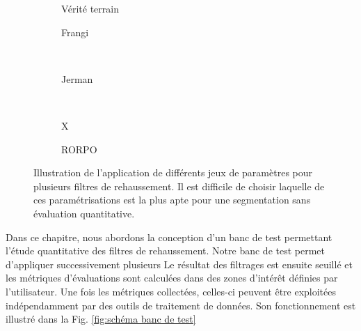 \begin{figure}[!ht]
  \captionsetup[subfigure]{justification=centering}
  \begin{subfigure}{\textwidth}
    \centering
  \caption{Vérité terrain}
  \end{subfigure}
  \begin{subfigure}{\textwidth}
  \caption{Frangi}
  \end{subfigure}
  \\
  \begin{subfigure}{\textwidth}
  \caption{Jerman}
  \end{subfigure}
  \\
  \begin{subfigure}{\textwidth}
  X
  \caption{RORPO}
  \end{subfigure}
  \caption{Illustration de l'application de différents jeux de paramètres pour plusieurs filtres de rehaussement. Il est difficile de choisir laquelle de ces paramétrisations est la plus apte pour une segmentation sans évaluation quantitative.}
  \label{fig:problematics}
\end{figure}

Dans ce chapitre, nous abordons la conception d'un banc de test permettant l'étude quantitative des filtres de rehaussement. Notre banc de test permet d'appliquer successivement plusieurs  Le résultat des filtrages est ensuite seuillé et les métriques d'évaluations sont calculées dans des zones d'intérêt définies par l'utilisateur. Une fois les métriques collectées, celles-ci peuvent être exploitées indépendamment par des outils de traitement de données. Son fonctionnement est illustré dans la Fig. \ref{fig:schéma banc de test}

